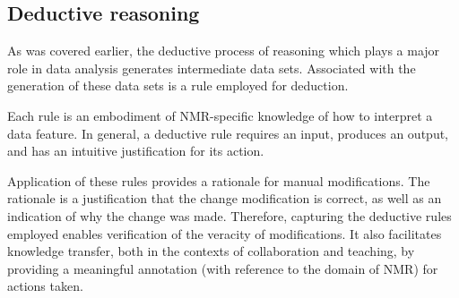 
\subsection{Deductive reasoning}

As was covered earlier, the deductive process of reasoning which plays
a major role in data analysis generates intermediate data sets.  Associated
with the generation of these data sets is a rule employed for deduction.

Each rule is an embodiment of NMR-specific knowledge of how to interpret a
data feature.  In general, a deductive rule requires an input, produces an
output, and has an intuitive justification for its action.  

Application of these rules provides a rationale for manual modifications.  The
rationale is a justification that the change modification is correct, as
well as an indication of why the change was made.  Therefore, capturing the
deductive rules employed enables verification of the veracity of modifications. 
It also facilitates knowledge transfer, both in the contexts of collaboration
and teaching, by providing a meaningful annotation (with reference to the
domain of NMR) for actions taken.

